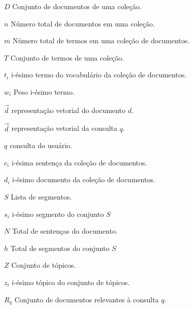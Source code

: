 


\begin{simbolos}

	\item[$D $]			Conjunto de documentos de uma coleção. 
	\item[$n $]			Número total de documentos em uma coleção.
	\item[$m $]			Número total de termos em uma coleção de documentos.
	\item[$T $]			Conjunto de termos de uma coleção. 
	\item[$t_i $]		i-ésimo termo do vocabulário da coleção de documentos. 
	\item[$w_i $]		Peso i-ésimo termo.
	\item[$ \vec{d} $]	representação vetorial do documento $d$.
	\item[$ \vec{d} $]	representação vetorial da consulta $q$.
	\item[$ q $]		consulta do usuário.
	\item[$ c_i $]		i-ésima sentença da coleção de documentos. 
	\item[$ d_i $]		i-ésimo documento da coleção de documentos. 
	\item[$ S $]		Lista de segmentos. 
	\item[$s_i $]		i-ésimo segmento do conjunto $S$
	\item[$ N $]		Total de sentenças do documento.
	\item[$ h $]		Total de segmentos do conjunto $S$
	\item[$ Z $]		Conjunto de tópicos. 
	\item[$ z_i $]		i-ésimo tópico do conjunto de tópicos. 
	\item[$R_q$]        Conjunto de documentos relevantes à consulta $q$.
	 


 
 
 
 
 
 
 
 
 
 
 
 
 
 
 
 
 
 
 
 
  \end{simbolos}





